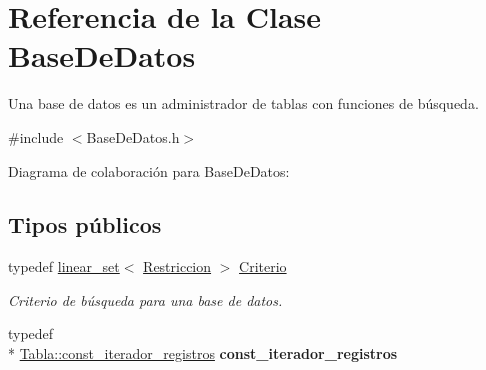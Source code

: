 \hypertarget{classBaseDeDatos}{\section{Referencia de la Clase Base\+De\+Datos}
\label{classBaseDeDatos}
}


Una base de datos es un administrador de tablas con funciones de búsqueda.  




{\ttfamily \#include $<$Base\+De\+Datos.\+h$>$}



Diagrama de colaboración para Base\+De\+Datos\+:
\subsection*{Tipos públicos}
\begin{DoxyCompactItemize}
\item 
\hypertarget{classBaseDeDatos_a6742a222e87623bc92a810a693fb337b}{typedef \hyperlink{classlinear__set}{linear\+\_\+set}$<$ \hyperlink{classRestriccion}{Restriccion} $>$ \hyperlink{classBaseDeDatos_a6742a222e87623bc92a810a693fb337b}{Criterio}}\label{classBaseDeDatos_a6742a222e87623bc92a810a693fb337b}

\begin{DoxyCompactList}\small\item\em Criterio de búsqueda para una base de datos. \end{DoxyCompactList}\item 
\hypertarget{classBaseDeDatos_a4d99e31416c8f54abdb24e88a8649d46}{typedef \\*
\hyperlink{classTabla_1_1const__iterador__registros}{Tabla\+::const\+\_\+iterador\+\_\+registros} {\bfseries const\+\_\+iterador\+\_\+registros}}\label{classBaseDeDatos_a4d99e31416c8f54abdb24e88a8649d46}

\end{DoxyCompactItemize}
